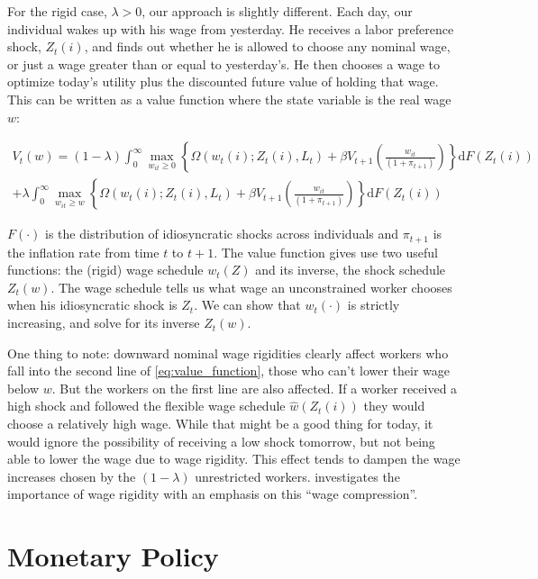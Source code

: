 \documentclass[12pt,a4paper]{scrartcl}            %
\begin{document}
For the rigid case, $\lambda > 0$, our approach is slightly different.
Each day, our individual wakes up with his wage from yesterday.
He receives a labor preference shock, $Z_t(i)$, and finds out whether he is allowed to choose any nominal wage, or just a wage greater than or equal to yesterday's.
He then chooses a wage to optimize today's utility plus the discounted future value of holding that wage.
This can be written as a value function where the state variable is the real wage $w$:

\begin{multline}
    \label{eq:value_function}
    V_t(w) = (1 - \lambda) \int_{0}^{\infty} \max_{w_{it} \geq 0} \left\{ \Omega( w_t(i); Z_t(i), L_t ) + \beta V_{t+1}\left( \frac{w_{it}}{(1 + \pi_{t+1})} \right) \right\} \mathrm{d}F(Z_t(i)) \\
                + \lambda  \int_{0}^{\infty} \max_{w_{it} \geq w} \left\{ \Omega( w_t(i); Z_t(i), L_t ) + \beta V_{t+1}\left( \frac{w_{it}}{(1 + \pi_{t+1})} \right) \right\} \mathrm{d}F(Z_t(i))
\end{multline}

$F(\cdot)$ is the distribution of idiosyncratic shocks across individuals and $\pi_{t+1}$ is the inflation rate from time $t$ to $t+1$.
The value function gives use two useful functions: the (rigid) wage schedule $w_t(Z)$ and its inverse, the shock schedule $Z_t(w)$.
The wage schedule tells us what wage an unconstrained worker chooses when his idiosyncratic shock is $Z_t$.
We can show that $w_t(\cdot)$ is strictly increasing, and solve for its inverse $Z_t(w)$.

One thing to note: downward nominal wage rigidities clearly affect workers who fall into the second line of \eqref{eq:value_function}, those who can't lower their wage below $w$.
But the workers on the first line are also affected.
If a worker received a high shock and followed the flexible wage schedule $\hat{w}(Z_t(i))$ they would choose a relatively high wage.
While that might be a good thing for today, it would ignore the possibility of receiving a low shock tomorrow, but not being able to lower the wage due to wage rigidity.
This effect tends to dampen the wage increases chosen by the $(1 - \lambda)$ unrestricted workers.
\cite{elsby_2009} investigates the importance of wage rigidity with an emphasis on this ``wage compression''.

\section{Monetary Policy}
\label{sec:monetary_policy}
\end{document}
